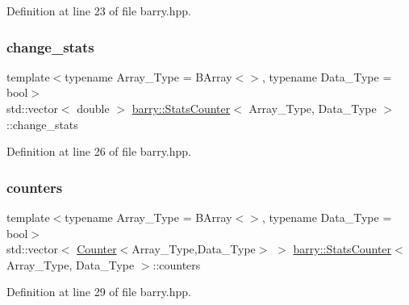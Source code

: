 Definition at line 23 of file barry.\+hpp.

\mbox{\label{classbarry_1_1_stats_counter_a90b8fddb02b2628cc8d71986f8cdf0ed}} 
\subsubsection{\texorpdfstring{change\+\_\+stats}{change\_stats}}
{\footnotesize\ttfamily template$<$typename Array\+\_\+\+Type  = B\+Array$<$$>$, typename Data\+\_\+\+Type  = bool$>$ \\
std\+::vector$<$ double $>$ \hyperlink{classbarry_1_1_stats_counter}{barry\+::\+Stats\+Counter}$<$ Array\+\_\+\+Type, Data\+\_\+\+Type $>$\+::change\+\_\+stats}



Definition at line 26 of file barry.\+hpp.

\mbox{\label{classbarry_1_1_stats_counter_a4f4caa8175df7b60d126af291f6be6cc}} 
\subsubsection{\texorpdfstring{counters}{counters}}
{\footnotesize\ttfamily template$<$typename Array\+\_\+\+Type  = B\+Array$<$$>$, typename Data\+\_\+\+Type  = bool$>$ \\
std\+::vector$<$ \hyperlink{classbarry_1_1_counter}{Counter}$<$Array\+\_\+\+Type,Data\+\_\+\+Type$>$ $>$ \hyperlink{classbarry_1_1_stats_counter}{barry\+::\+Stats\+Counter}$<$ Array\+\_\+\+Type, Data\+\_\+\+Type $>$\+::counters}



Definition at line 29 of file barry.\+hpp.

\mbox{\label{classbarry_1_1_stats_counter_ad99718884cffbeca3cb98d574f6956a1}} 
